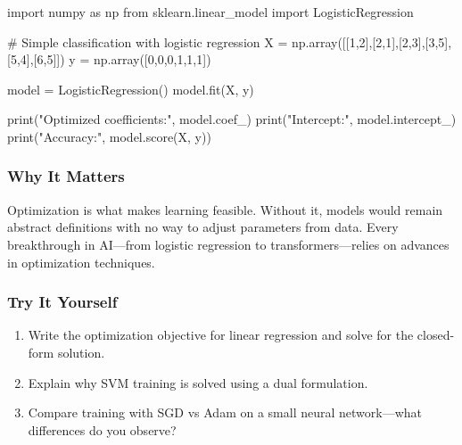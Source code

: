 \documentclass[
  letterpaper,
  DIV=11,
  numbers=noendperiod]{scrreprt}
\newenvironment{Shaded}{\begin{snugshade}}{\end{snugshade}}
\newcommand{\BuiltInTok}[1]{\textcolor[rgb]{0.00,0.23,0.31}{#1}}
\newcommand{\CommentTok}[1]{\textcolor[rgb]{0.37,0.37,0.37}{#1}}
\newcommand{\DecValTok}[1]{\textcolor[rgb]{0.68,0.00,0.00}{#1}}
\newcommand{\ImportTok}[1]{\textcolor[rgb]{0.00,0.46,0.62}{#1}}
\newcommand{\NormalTok}[1]{\textcolor[rgb]{0.00,0.23,0.31}{#1}}
\newcommand{\OperatorTok}[1]{\textcolor[rgb]{0.37,0.37,0.37}{#1}}
\newcommand{\StringTok}[1]{\textcolor[rgb]{0.13,0.47,0.30}{#1}}
\providecommand{\tightlist}{%
  \setlength{\itemsep}{0pt}\setlength{\parskip}{0pt}}
\begin{document}
\begin{Shaded}
\begin{Highlighting}[]
\ImportTok{import}\NormalTok{ numpy }\ImportTok{as}\NormalTok{ np}
\ImportTok{from}\NormalTok{ sklearn.linear\_model }\ImportTok{import}\NormalTok{ LogisticRegression}

\CommentTok{\# Simple classification with logistic regression}
\NormalTok{X }\OperatorTok{=}\NormalTok{ np.array([[}\DecValTok{1}\NormalTok{,}\DecValTok{2}\NormalTok{],[}\DecValTok{2}\NormalTok{,}\DecValTok{1}\NormalTok{],[}\DecValTok{2}\NormalTok{,}\DecValTok{3}\NormalTok{],[}\DecValTok{3}\NormalTok{,}\DecValTok{5}\NormalTok{],[}\DecValTok{5}\NormalTok{,}\DecValTok{4}\NormalTok{],[}\DecValTok{6}\NormalTok{,}\DecValTok{5}\NormalTok{]])}
\NormalTok{y }\OperatorTok{=}\NormalTok{ np.array([}\DecValTok{0}\NormalTok{,}\DecValTok{0}\NormalTok{,}\DecValTok{0}\NormalTok{,}\DecValTok{1}\NormalTok{,}\DecValTok{1}\NormalTok{,}\DecValTok{1}\NormalTok{])}

\NormalTok{model }\OperatorTok{=}\NormalTok{ LogisticRegression()}
\NormalTok{model.fit(X, y)}

\BuiltInTok{print}\NormalTok{(}\StringTok{"Optimized coefficients:"}\NormalTok{, model.coef\_)}
\BuiltInTok{print}\NormalTok{(}\StringTok{"Intercept:"}\NormalTok{, model.intercept\_)}
\BuiltInTok{print}\NormalTok{(}\StringTok{"Accuracy:"}\NormalTok{, model.score(X, y))}
\end{Highlighting}
\end{Shaded}

\subsubsection{Why It Matters}\label{why-it-matters-47}

Optimization is what makes learning feasible. Without it, models would
remain abstract definitions with no way to adjust parameters from data.
Every breakthrough in AI---from logistic regression to
transformers---relies on advances in optimization techniques.

\subsubsection{Try It Yourself}\label{try-it-yourself-149}

\begin{enumerate}
\def\labelenumi{\arabic{enumi}.}
\tightlist
\item
  Write the optimization objective for linear regression and solve for
  the closed-form solution.
\item
  Explain why SVM training is solved using a dual formulation.
\item
  Compare training with SGD vs Adam on a small neural network---what
  differences do you observe?
\end{enumerate}
\end{document}
